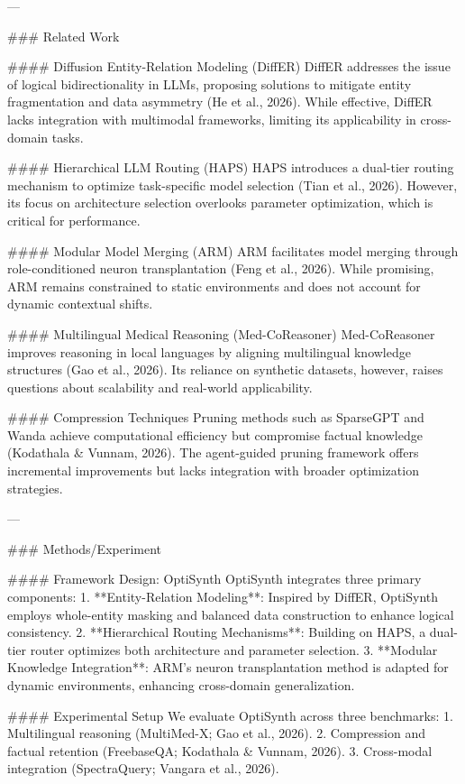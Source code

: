 ---

### Related Work

#### Diffusion Entity-Relation Modeling (DiffER)
DiffER addresses the issue of logical bidirectionality in LLMs, proposing solutions to mitigate entity fragmentation and data asymmetry (He et al., 2026). While effective, DiffER lacks integration with multimodal frameworks, limiting its applicability in cross-domain tasks.

#### Hierarchical LLM Routing (HAPS)
HAPS introduces a dual-tier routing mechanism to optimize task-specific model selection (Tian et al., 2026). However, its focus on architecture selection overlooks parameter optimization, which is critical for performance.

#### Modular Model Merging (ARM)
ARM facilitates model merging through role-conditioned neuron transplantation (Feng et al., 2026). While promising, ARM remains constrained to static environments and does not account for dynamic contextual shifts.

#### Multilingual Medical Reasoning (Med-CoReasoner)
Med-CoReasoner improves reasoning in local languages by aligning multilingual knowledge structures (Gao et al., 2026). Its reliance on synthetic datasets, however, raises questions about scalability and real-world applicability.

#### Compression Techniques
Pruning methods such as SparseGPT and Wanda achieve computational efficiency but compromise factual knowledge (Kodathala & Vunnam, 2026). The agent-guided pruning framework offers incremental improvements but lacks integration with broader optimization strategies.

---

### Methods/Experiment

#### Framework Design: OptiSynth
OptiSynth integrates three primary components: 
1. **Entity-Relation Modeling**: Inspired by DiffER, OptiSynth employs whole-entity masking and balanced data construction to enhance logical consistency.
2. **Hierarchical Routing Mechanisms**: Building on HAPS, a dual-tier router optimizes both architecture and parameter selection.
3. **Modular Knowledge Integration**: ARM's neuron transplantation method is adapted for dynamic environments, enhancing cross-domain generalization.

#### Experimental Setup
We evaluate OptiSynth across three benchmarks: 
1. Multilingual reasoning (MultiMed-X; Gao et al., 2026).
2. Compression and factual retention (FreebaseQA; Kodathala & Vunnam, 2026).
3. Cross-modal integration (SpectraQuery; Vangara et al., 2026).

